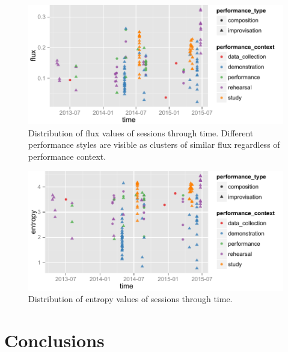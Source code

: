 \documentclass{sigchi}
\begin{document}
\begin{figure}
  \centering
  \includegraphics[width=\linewidth]{figures/flux-through-time}
  \caption{Distribution of flux values of sessions through time.
    Different performance styles are visible as clusters of similar
    flux regardless of performance context.
    \label{fig:flux-through-time}}
\end{figure}

\begin{figure}
  \centering
  \includegraphics[width=\linewidth]{figures/entropy-through-time}
  \caption{Distribution of entropy values of sessions through time.
    \label{fig:entropy-through-time}}
\end{figure}


\section{Conclusions}


\end{document}
